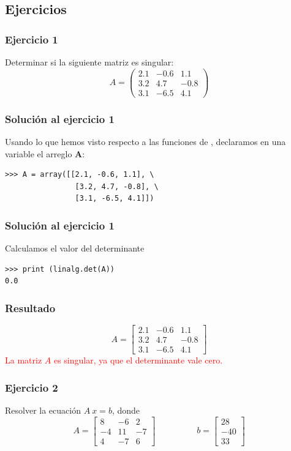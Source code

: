 \subsection*{Ejercicios}
\begin{frame}
\frametitle{Ejercicio 1}
Determinar si la siguiente matriz es singular:
\[ A = 
\begin{pmatrix}
2.1 & -0.6 & 1.1 \\
3.2 & 4.7 & -0.8 \\
3.1 & -6.5 & 4.1
\end{pmatrix} \]
\end{frame}
\begin{frame}[fragile]
\frametitle{Solución al ejercicio 1}
Usando lo que hemos visto respecto a las funciones de , declaramos en una variable el arreglo $\mathbf{A}$:
\begin{verbatim}
>>> A = array([[2.1, -0.6, 1.1], \
				[3.2, 4.7, -0.8], \
				[3.1, -6.5, 4.1]])
\end{verbatim}
\end{frame}
\begin{frame}[fragile]
\frametitle{Solución al ejercicio 1}
Calculamos el valor del determinante
\begin{verbatim}
>>> print (linalg.det(A))
0.0
\end{verbatim}
\end{frame}
\begin{frame}
\frametitle{Resultado}
\[ A = 
\begin{bmatrix}
2.1 & -0.6 & 1.1 \\
3.2 & 4.7 & -0.8 \\
3.1 & -6.5 & 4.1
\end{bmatrix} \]
\textcolor{red}{La matriz $A$ es singular, ya que el determinante vale cero.}
\end{frame}
\begin{frame}
\frametitle{Ejercicio 2}
Resolver la ecuación $A \: x=b$, donde
\[ A= \begin{bmatrix}
8 & -6 & 2 \\
-4 & 11 & -7 \\
4 & -7 & 6
\end{bmatrix}
\hspace{2cm}
b =\begin{bmatrix}
28 \\
-40 \\
33
\end{bmatrix} \]
\end{frame}

